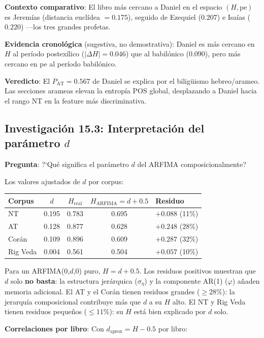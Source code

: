 \documentclass[12pt,a4paper]{article}
\begin{document}
\textbf{Contexto comparativo}: El libro m\'as cercano a Daniel en el espacio
$(H, \text{pe})$ es Jerem\'ias (distancia eucl\'idea $= 0.175$), seguido de
Ezequiel ($0.207$) e Isa\'ias ($0.220$) ---los tres grandes profetas.

\textbf{Evidencia cronol\'ogica} (sugestiva, no demostrativa): Daniel es m\'as
cercano en $H$ al per\'iodo postex\'ilico ($|\Delta H| = 0.046$) que al
babil\'onico ($0.090$), pero m\'as cercano en pe al per\'iodo babil\'onico.

\textbf{Veredicto}: El $P_{\text{AT}} = 0.567$ de Daniel se explica por
el bilig\"uismo hebreo/arameo. Las secciones arameas elevan la entrop\'ia POS
global, desplazando a Daniel hacia el rango NT en la feature m\'as discriminativa.

\subsection{Investigaci\'on 15.3: Interpretaci\'on del par\'ametro $d$}

\textbf{Pregunta}: ?`Qu\'e significa el par\'ametro $d$ del ARFIMA composicionalmente?

Los valores ajustados de $d$ por corpus:

\begin{center}
\begin{tabular}{lcccl}
\toprule
\textbf{Corpus} & $d$ & $H_{\text{real}}$ & $H_{\text{ARFIMA}} = d + 0.5$ & \textbf{Residuo} \\
\midrule
NT       & 0.195 & 0.783 & 0.695 & $+0.088$ (11\%) \\
AT       & 0.128 & 0.877 & 0.628 & $+0.248$ (28\%) \\
Cor\'an  & 0.109 & 0.896 & 0.609 & $+0.287$ (32\%) \\
Rig Veda & 0.004 & 0.561 & 0.504 & $+0.057$ (10\%) \\
\bottomrule
\end{tabular}
\end{center}

\noindent
Para un ARFIMA(0,$d$,0) puro, $H = d + 0.5$. Los residuos positivos muestran que
$d$ solo \textbf{no basta}: la estructura jer\'arquica ($\sigma_\eta$) y la
componente AR(1) ($\varphi$) a\~naden memoria adicional. El AT y el Cor\'an tienen
residuos grandes ($\geq 28$\%): la jerarqu\'ia composicional contribuye m\'as que
$d$ a su $H$ alto. El NT y Rig Veda tienen residuos peque\~nos ($\leq 11$\%):
su $H$ est\'a bien explicado por $d$ solo.

\textbf{Correlaciones por libro}: Con $d_{\text{aprox}} = H - 0.5$ por libro:
\end{document}
